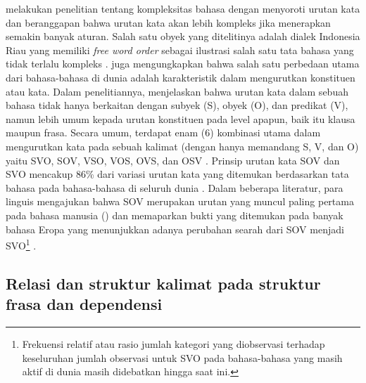 \cite{gil2001creoles} melakukan penelitian tentang kompleksitas bahasa dengan menyoroti urutan kata dan beranggapan bahwa urutan kata akan lebih kompleks jika menerapkan semakin banyak aturan. Salah satu obyek yang ditelitinya adalah dialek Indonesia Riau yang memiliki \textit{free word order} sebagai ilustrasi salah satu tata bahasa yang tidak terlalu kompleks \citep{gil2001creoles}. \cite{dryer2007word} juga mengungkapkan bahwa salah satu perbedaan utama dari bahasa-bahasa di dunia adalah karakteristik dalam mengurutkan konstituen atau kata. Dalam penelitiannya, \cite{dryer2007word} menjelaskan bahwa urutan kata dalam sebuah bahasa tidak hanya berkaitan dengan subyek (S), obyek (O), dan predikat (V), namun lebih umum kepada urutan konstituen pada level apapun, baik itu klausa maupun frasa. Secara umum, terdapat enam (6) kombinasi utama dalam mengurutkan kata pada sebuah kalimat (dengan hanya memandang S, V, dan O) yaitu SVO, SOV, VSO, VOS, OVS, dan OSV \cite{dryer2007word}. Prinsip urutan kata SOV dan SVO mencakup 86\% dari variasi urutan kata yang ditemukan berdasarkan tata bahasa pada bahasa-bahasa di seluruh dunia \citep{dryer2005world}. Dalam beberapa literatur, para linguis mengajukan bahwa SOV merupakan urutan yang muncul paling pertama pada bahasa manusia (\citealp{givon1979syntax, gell2011origin, newmeyer2000language}) dan memaparkan bukti yang ditemukan pada banyak bahasa Eropa yang menunjukkan adanya perubahan searah dari SOV menjadi SVO\footnote{Frekuensi relatif atau rasio jumlah kategori yang diobservasi terhadap keseluruhan jumlah observasi untuk SVO pada bahasa-bahasa yang masih aktif di dunia masih didebatkan hingga saat ini.} \citep{newmeyer2000language}. 
 
\subsection{Relasi dan struktur kalimat pada struktur frasa dan dependensi}


